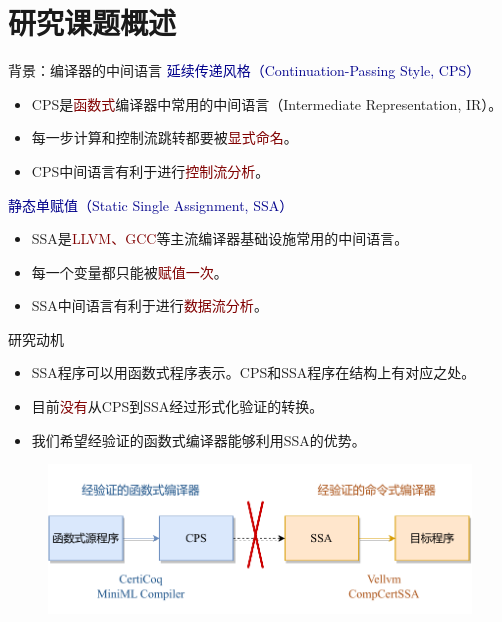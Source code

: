 
\section{研究课题概述}

\begin{frame}{背景：编译器的中间语言}
  \textcolor{DarkBlue}{延续传递风格（Continuation-Passing Style, CPS）}
  \begin{itemize}
    \item CPS是\textcolor{Maroon}{函数式}编译器中常用的中间语言（Intermediate Representation, IR）。
    \item 每一步计算和控制流跳转都要被\textcolor{Maroon}{显式命名}。
    \item CPS中间语言有利于进行\textcolor{Maroon}{控制流分析}。
  \end{itemize}
  \vspace{2ex}
  \textcolor{DarkBlue}{静态单赋值（Static Single Assignment, SSA）}
  \begin{itemize}
    \item SSA是\textcolor{Maroon}{LLVM、GCC}等主流编译器基础设施常用的中间语言。
    \item 每一个变量都只能被\textcolor{Maroon}{赋值一次}。
    \item SSA中间语言有利于进行\textcolor{Maroon}{数据流分析}。
  \end{itemize}
\end{frame}

\begin{frame}{研究动机}
    \begin{itemize}
      \item SSA程序可以用函数式程序表示。CPS和SSA程序在结构上有对应之处。
      \item 目前\textcolor{Maroon}{没有}从CPS到SSA经过形式化验证的转换。
      \item 我们希望经验证的函数式编译器能够利用SSA的优势。
    \end{itemize} 
    \begin{figure}
      \centering
      \includegraphics[width=0.7\linewidth]{figures/motiva.pdf}
      \label{fig:moti1}
    \end{figure}
\end{frame}

